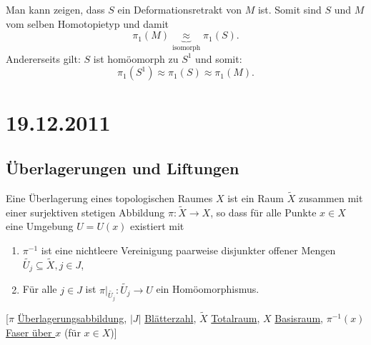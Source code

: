 \documentclass[a4paper,11pt,notitlepage]{report}
\theoremstyle{definition}
\begin{document}
Man kann zeigen, dass $S$ ein Deformationsretrakt von $M$ ist.
\newline
Somit sind $S$ und $M$ vom selben Homotopietyp und damit $$\pi_1(M) \underbrace{\approx}_{\text{isomorph}} \pi_1(S).$$
Andererseits gilt: $S$ ist homöomorph zu $S^1$ und somit: 
$$\pi_1(S^1) \approx \pi_1(S) \approx \pi_1(M).$$

\chapter{19.12.2011}
\section{Überlagerungen und Liftungen}

\begin{definition}
	Eine Überlagerung eines topologischen Raumes $X$ ist ein Raum $\widetilde{X}$ zusammen mit einer surjektiven stetigen Abbildung $\pi \colon \widetilde{X} \rightarrow X$, so dass für alle Punkte $x \in X$ eine Umgebung $U=U(x)$ existiert mit
	\begin{enumerate}
		\item $\pi^{-1}$ ist eine nichtleere Vereinigung paarweise disjunkter offener Mengen $\widetilde{U_j} \subseteq \widetilde{X}, j \in J$,
		\item Für alle $j \in J$ ist $\pi \big |_{\widetilde{U_j}} \colon \widetilde{U_j} \rightarrow U$ ein Homöomorphismus.
	\end{enumerate}
\end{definition}

[$\pi$ \underline{Überlagerungsabbildung}, $|J|$ \underline{Blätterzahl}, $\widetilde{X}$ \underline{Totalraum}, $X$ \underline{Basisraum}, $\pi^{-1}(x)$ \underline{Faser über $x$} (für $x \in X$)]
\end{document}

